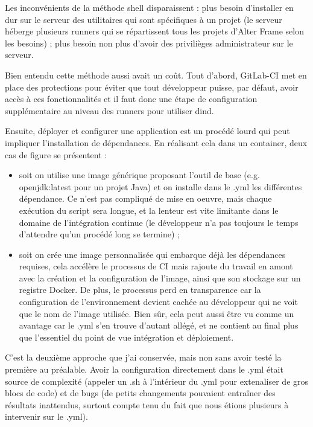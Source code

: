 Les inconvénients de la méthode shell disparaissent : plus besoin d'installer en dur sur le serveur des utilitaires qui sont spécifiques à un projet (le serveur héberge plusieurs runners qui se répartissent tous les projets d'Alter Frame selon les besoins) ; plus besoin non plus d'avoir des privilièges administrateur sur le serveur.

Bien entendu cette méthode aussi avait un coût. Tout d'abord, GitLab-CI met en place des protections pour éviter que tout développeur puisse, par défaut, avoir accès à ces fonctionnalités et il faut donc une étape de configuration supplémentaire au niveau des runners pour utiliser dind.

Ensuite, déployer et configurer une application est un procédé lourd qui peut impliquer l'installation de dépendances. En réalisant cela dans un container, deux cas de figure se présentent :
\begin{itemize}[label=$\bullet$]
\item soit on utilise une image générique proposant l'outil de base (e.g. openjdk:latest pour un projet Java) et on installe dans le .yml les différentes dépendance. Ce n'est pas compliqué de mise en oeuvre, mais chaque exécution du script sera longue, et la lenteur est vite limitante dans le domaine de l'intégration continue (le développeur n'a pas toujours le temps d'attendre qu'un procédé long se termine) ;
\item soit on crée une image personnalisée qui embarque déjà les dépendances requises, cela accélère le processus de CI mais rajoute du travail en amont avec la création et la configuration de l'image, ainsi que son stockage sur un registre Docker. De plus, le processus perd en transparence car la configuration de l'environnement devient cachée au développeur qui ne voit que le nom de l'image utilisée. Bien sûr, cela peut aussi être vu comme un avantage car le .yml s'en trouve d'autant allégé, et ne contient au final plus que l'essentiel du point de vue intégration et déploiement. 
\end{itemize}

C'est la deuxième approche que j'ai conservée, mais non sans avoir testé la première au préalable. Avoir la configuration directement dans le .yml était source de complexité (appeler un .sh à l'intérieur du .yml pour extenaliser de gros blocs de code) et de bugs (de petits changements pouvaient entraîner des résultats inattendus, surtout compte tenu du fait que nous étions plusieurs à intervenir sur le .yml).

